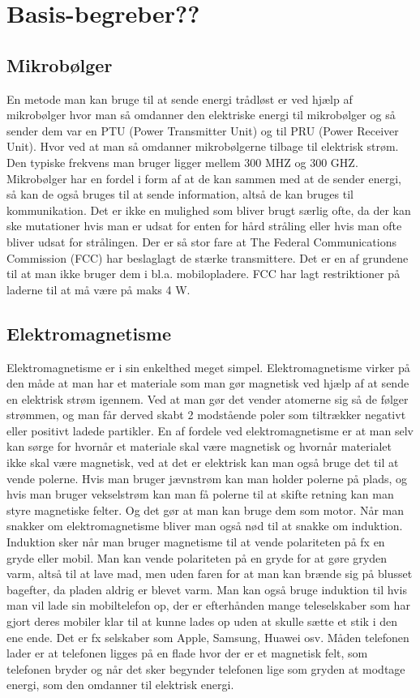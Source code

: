 \section{Basis-begreber??}
\subsection{Mikrobølger}
En metode man kan bruge til at sende energi trådløst er ved hjælp af mikrobølger hvor man så omdanner den elektriske energi til mikrobølger og så sender dem var en PTU (Power Transmitter Unit) og til PRU (Power Receiver Unit). Hvor ved at man så omdanner mikrobølgerne tilbage til elektrisk strøm. Den typiske frekvens man bruger ligger mellem 300 MHZ og 300 GHZ. Mikrobølger har en fordel i form af at de kan sammen med at de sender energi, så kan de også bruges til at sende information, altså de kan bruges til kommunikation.  Det er ikke en mulighed som bliver brugt særlig ofte, da der kan ske mutationer hvis man er udsat for enten for hård stråling eller hvis man ofte bliver udsat for strålingen. Der er så stor fare at The Federal Communications Commission (FCC) har beslaglagt de stærke transmittere. Det er en af grundene til at man ikke bruger dem i bl.a. mobilopladere. FCC har lagt restriktioner på laderne til at må være på maks 4 W.
\subsection{Elektromagnetisme}
Elektromagnetisme er i sin enkelthed meget simpel. Elektromagnetisme virker på den måde at man har et materiale som man gør magnetisk ved hjælp af at sende en elektrisk strøm igennem. Ved at man gør det vender atomerne sig så de følger strømmen, og man får derved skabt 2 modstående poler som tiltrækker negativt eller positivt ladede partikler. En af fordele ved elektromagnetisme er at man selv kan sørge for hvornår et materiale skal være magnetisk og hvornår materialet ikke skal være magnetisk, ved at det er elektrisk kan man også bruge det til at vende polerne. Hvis man bruger jævnstrøm kan man holder polerne på plads, og hvis man bruger vekselstrøm kan man få polerne til at skifte retning kan man styre magnetiske felter. Og det gør at man kan bruge dem som motor. Når man snakker om elektromagnetisme bliver man også nød til at snakke om induktion. Induktion sker når man bruger magnetisme til at vende polariteten på fx en gryde eller mobil. Man kan vende polariteten på en gryde for at gøre gryden varm, altså til at lave mad, men uden faren for at man kan brænde sig på blusset bagefter, da pladen aldrig er blevet varm. Man kan også bruge induktion til hvis man vil lade sin mobiltelefon op, der er efterhånden mange teleselskaber som har gjort deres mobiler klar til at kunne lades op uden at skulle sætte et stik i den ene ende. Det er fx selskaber som Apple, Samsung, Huawei osv. Måden telefonen lader er at telefonen ligges på en flade hvor der er et magnetisk felt, som telefonen bryder og når det sker begynder telefonen lige som gryden at modtage energi, som den omdanner til elektrisk energi.
